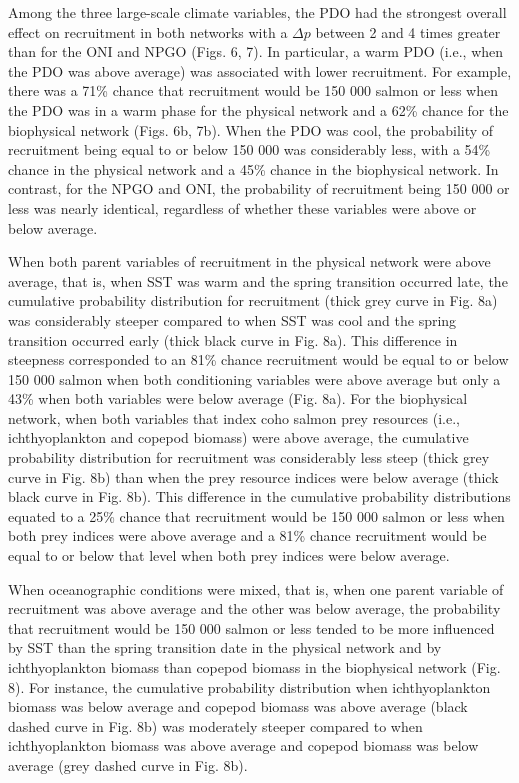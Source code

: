 Among the three large-scale climate variables, the PDO had the strongest overall
effect on recruitment in both networks with a \(\Delta p\) between 2 and 4 times
greater than for the ONI and NPGO (Figs. 6, 7). In particular, a warm PDO (i.e.,
when the PDO was above average) was associated with lower recruitment. For
example, there was a 71\% chance that recruitment would be 150 000 salmon or
less when the PDO was in a warm phase for the physical network and a 62\% chance
for the biophysical network (Figs. 6b, 7b). When the PDO was cool, the
probability of recruitment being equal to or below 150 000 was considerably
less, with a 54\% chance in the physical network and a 45\% chance in the
biophysical network. In contrast, for the NPGO and ONI, the probability of
recruitment being 150 000 or less was nearly identical, regardless of whether
these variables were above or below average.

When both parent variables of recruitment in the physical network were above
average, that is, when SST was warm and the spring transition occurred late, the
cumulative probability distribution for recruitment (thick grey curve in Fig.
8a) was considerably steeper compared to when SST was cool and the spring
transition occurred early (thick black curve in Fig. 8a). This difference in
steepness corresponded to an 81\% chance recruitment would be equal to or below
150 000 salmon when both conditioning variables were above average but only a
43\% when both variables were below average (Fig. 8a). For the biophysical
network, when both variables that index coho salmon prey resources (i.e.,
ichthyoplankton and copepod biomass) were above average, the cumulative
probability distribution for recruitment was considerably less steep (thick grey
curve in Fig. 8b) than when the prey resource indices were below average (thick
black curve in Fig. 8b). This difference in the cumulative probability
distributions equated to a 25\% chance that recruitment would be 150 000 salmon
or less when both prey indices were above average and a 81\% chance recruitment
would be equal to or below that level when both prey indices were below average.

When oceanographic conditions were mixed, that is, when one parent variable of
recruitment was above average and the other was below average, the probability
that recruitment would be 150 000 salmon or less tended to be more influenced by
SST than the spring transition date in the physical network and by
ichthyoplankton biomass than copepod biomass in the biophysical network (Fig.
8). For instance, the cumulative probability distribution when ichthyoplankton
biomass was below average and copepod biomass was above average (black dashed
curve in Fig. 8b) was moderately steeper compared to when ichthyoplankton
biomass was above average and copepod biomass was below average (grey dashed
curve in Fig. 8b).


